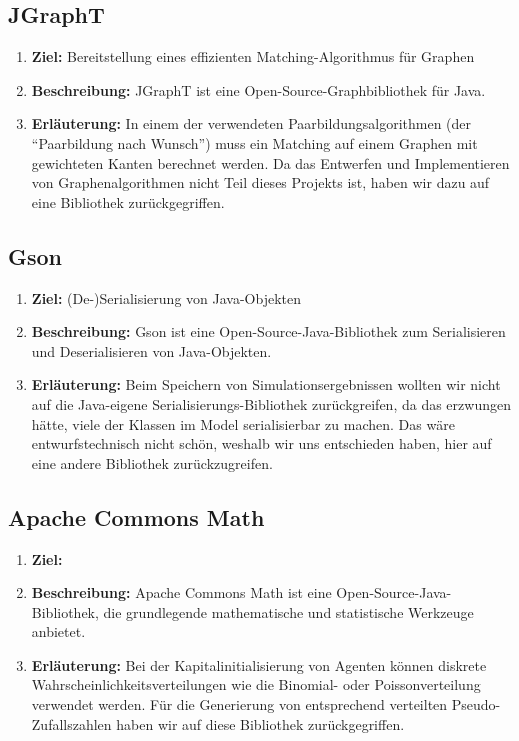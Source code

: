 \documentclass[parskip=full,11pt]{scrartcl}
\begin{document}
\subsection{JGraphT}
\begin{enumerate}
\item[] \textbf{Ziel:} Bereitstellung eines effizienten Matching-Algorithmus für Graphen
\item[] \textbf{Beschreibung:} JGraphT ist eine Open-Source-Graphbibliothek für Java.
\item[] \textbf{Erläuterung:} In einem der verwendeten Paarbildungsalgorithmen (der \enquote{Paarbildung nach Wunsch}) muss ein Matching auf einem Graphen mit gewichteten Kanten berechnet werden. Da das Entwerfen und Implementieren von Graphenalgorithmen nicht Teil dieses Projekts ist, haben wir dazu auf eine Bibliothek zurückgegriffen.
\end{enumerate}
\subsection{Gson}
\begin{enumerate}
\item[] \textbf{Ziel:} (De-)Serialisierung von Java-Objekten
\item[] \textbf{Beschreibung:} Gson ist eine Open-Source-Java-Bibliothek zum Serialisieren und Deserialisieren von Java-Objekten.
\item[] \textbf{Erläuterung:} Beim Speichern von Simulationsergebnissen wollten wir nicht auf die Java-eigene Serialisierungs-Bibliothek zurückgreifen, da das erzwungen hätte, viele der Klassen im Model serialisierbar zu machen. Das wäre entwurfstechnisch nicht schön, weshalb wir uns entschieden haben, hier auf eine andere Bibliothek zurückzugreifen.
\end{enumerate}
\subsection{Apache Commons Math}
\begin{enumerate}
\item[] \textbf{Ziel:} 
\item[] \textbf{Beschreibung:} Apache Commons Math ist eine Open-Source-Java-Bibliothek, die grundlegende mathematische und statistische Werkzeuge anbietet.
\item[] \textbf{Erläuterung:} Bei der Kapitalinitialisierung von Agenten können diskrete Wahrscheinlichkeitsverteilungen wie die Binomial- oder Poissonverteilung verwendet werden. Für die Generierung von entsprechend verteilten Pseudo-Zufallszahlen haben wir auf diese Bibliothek zurückgegriffen.
\end{enumerate}
\end{document}
